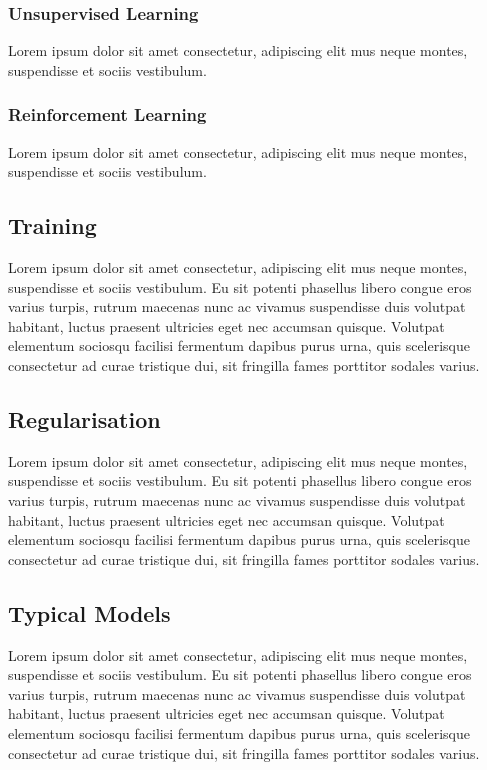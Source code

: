 \subsubsection{Unsupervised Learning} 
Lorem ipsum dolor sit amet consectetur, adipiscing elit mus neque montes, suspendisse et sociis vestibulum.

\subsubsection{Reinforcement Learning} 
Lorem ipsum dolor sit amet consectetur, adipiscing elit mus neque montes, suspendisse et sociis vestibulum.

\subsection{Training}
Lorem ipsum dolor sit amet consectetur, adipiscing elit mus neque montes, suspendisse et sociis vestibulum. Eu sit potenti phasellus libero congue eros varius turpis, rutrum maecenas nunc ac vivamus suspendisse duis volutpat habitant, luctus praesent ultricies eget nec accumsan quisque. Volutpat elementum sociosqu facilisi fermentum dapibus purus urna, quis scelerisque consectetur ad curae tristique dui, sit fringilla fames porttitor sodales varius.
\subsection{Regularisation}
Lorem ipsum dolor sit amet consectetur, adipiscing elit mus neque montes, suspendisse et sociis vestibulum. Eu sit potenti phasellus libero congue eros varius turpis, rutrum maecenas nunc ac vivamus suspendisse duis volutpat habitant, luctus praesent ultricies eget nec accumsan quisque. Volutpat elementum sociosqu facilisi fermentum dapibus purus urna, quis scelerisque consectetur ad curae tristique dui, sit fringilla fames porttitor sodales varius.
\subsection{Typical Models}
Lorem ipsum dolor sit amet consectetur, adipiscing elit mus neque montes, suspendisse et sociis vestibulum. Eu sit potenti phasellus libero congue eros varius turpis, rutrum maecenas nunc ac vivamus suspendisse duis volutpat habitant, luctus praesent ultricies eget nec accumsan quisque. Volutpat elementum sociosqu facilisi fermentum dapibus purus urna, quis scelerisque consectetur ad curae tristique dui, sit fringilla fames porttitor sodales varius.

